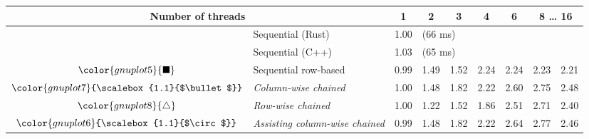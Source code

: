 \begin{tabular}{clrrrrrrr}
\toprule
\multicolumn{2}{c}{\textbf{Number of threads}} & \multicolumn{1}{c}{\textbf{ 1 }} & \multicolumn{1}{c}{\textbf{ 2 }} & \multicolumn{1}{c}{\textbf{ 3 }} & \multicolumn{1}{c}{\textbf{ 4 }} & \multicolumn{1}{c}{\textbf{ 6 }} & \multicolumn{2}{c}{\textbf{ 8 } \dots \textbf{ 16 }} \\
\midrule
& Sequential (Rust) & \multicolumn{1}{r}{ 1.00 } & \multicolumn{ 6 }{l}{(66 ms)} \\
& Sequential (C++) & \multicolumn{1}{r}{ 1.03 } & \multicolumn{ 6 }{l}{(65 ms)} \\
\rowcolor{gnuplot5!10}$\color{gnuplot5}{\blacksquare}$ & Sequential row-based & \cellcolor{gnuplot5!10} 0.99 & \cellcolor{gnuplot5!10} 1.49 & \cellcolor{gnuplot5!10} 1.52 & \cellcolor{gnuplot5!10} 2.24 & \cellcolor{gnuplot5!10} 2.24 & \cellcolor{gnuplot5!10} 2.23 & \cellcolor{gnuplot5!10} 2.21 \\
\rowcolor{gnuplot7!30}$\color{gnuplot7}{\scalebox{1.1}{$\bullet$}}$ & \textit{Column-wise chained} & \cellcolor{gnuplot7!30} 1.00 & \cellcolor{gnuplot7!30} 1.48 & \cellcolor{gnuplot7!30} 1.82 & \cellcolor{gnuplot7!30} 2.22 & \cellcolor{gnuplot7!30} 2.60 & \cellcolor{gnuplot7!30} 2.75 & \cellcolor{gnuplot7!30} 2.48 \\
\rowcolor{gnuplot8!30}$\color{gnuplot8}{\triangle}$ & \textit{Row-wise chained} & \cellcolor{gnuplot8!30} 1.00 & \cellcolor{gnuplot8!30} 1.22 & \cellcolor{gnuplot8!30} 1.52 & \cellcolor{gnuplot8!30} 1.86 & \cellcolor{gnuplot8!30} 2.51 & \cellcolor{gnuplot8!30} 2.71 & \cellcolor{gnuplot8!30} 2.40 \\
\rowcolor{gnuplot6!30}$\color{gnuplot6}{\scalebox{1.1}{$\circ$}}$ & \textit{Assisting column-wise chained} & \cellcolor{gnuplot6!30} 0.99 & \cellcolor{gnuplot6!30} 1.48 & \cellcolor{gnuplot6!30} 1.82 & \cellcolor{gnuplot6!30} 2.22 & \cellcolor{gnuplot6!30} 2.64 & \cellcolor{gnuplot6!30} 2.77 & \cellcolor{gnuplot6!30} 2.46 \\
\bottomrule
\end{tabular}
